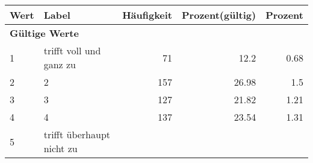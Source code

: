      \begin{longtable}{lXrrr}
     \toprule
     \textbf{Wert} & \textbf{Label} & \textbf{Häufigkeit} & \textbf{Prozent(gültig)} & \textbf{Prozent} \\
     \endhead
     \midrule
     \multicolumn{5}{l}{\textbf{Gültige Werte}}\\

     1 &
     \multicolumn{1}{X}{ trifft voll und ganz zu   } &


       \num{71} &
       \num[round-mode=places,round-precision=2]{12.2} &
         \num[round-mode=places,round-precision=2]{0.68} \\

     2 &
     \multicolumn{1}{X}{ 2   } &


       \num{157} &
       \num[round-mode=places,round-precision=2]{26.98} &
         \num[round-mode=places,round-precision=2]{1.5} \\

     3 &
     \multicolumn{1}{X}{ 3   } &


       \num{127} &
       \num[round-mode=places,round-precision=2]{21.82} &
         \num[round-mode=places,round-precision=2]{1.21} \\

     4 &
     \multicolumn{1}{X}{ 4   } &


       \num{137} &
       \num[round-mode=places,round-precision=2]{23.54} &
         \num[round-mode=places,round-precision=2]{1.31} \\

     5 &
     \multicolumn{1}{X}{ trifft überhaupt nicht zu   } &



\end{longtable}
